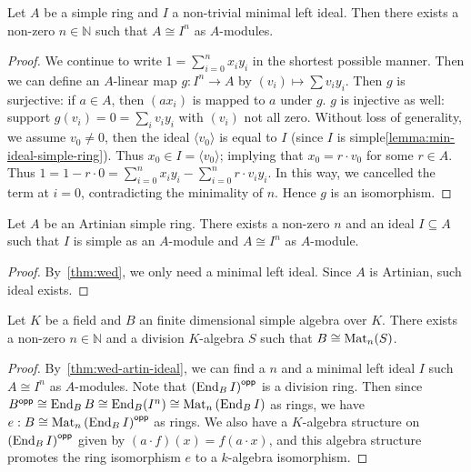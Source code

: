 \begin{theorem}[Wedderburn]\label{thm:wed}
  Let $A$ be a simple ring and $I$ a non-trivial minimal left ideal. Then there exists a non-zero $n \in \mathbb{N}$ such that $A \cong I^{n}$ as $A$-modules.
  \leanok
\end{theorem}

\begin{proof}
  We continue to write $1 = \sum_{i=0}^{n}x_{i}y_{i}$ in the shortest possible manner. Then we can define an $A$-linear map $g : I^{n}\to A$ by $(v_{i})\mapsto \sum v_{i}y_{i}$. Then $g$ is surjective: if $a \in A$, then $(ax_{i})$ is mapped to $a$ under $g$. $g$ is injective as well: support $g(v_{i})=0=\sum_{i}v_{i}y_{i}$ with $(v_{i})$ not all zero. Without loss of generality, we assume $v_{0} \ne 0$, then the ideal $\langle v_{0}\rangle$ is equal to $I$ (since $I$ is simple\cref{lemma:min-ideal-simple-ring}). Thus $x_{0}\in I = \langle v_{0}\rangle$; implying that $x_{0}=r\cdot v_{0}$ for some $r\in A$. Thus $1=1 - r\cdot 0 = \sum_{i=0}^{n}x_{i}y_{i}-\sum_{i=0}^{n}r\cdot v_{i}y_{i}$. In this way, we cancelled the term at $i=0$, contradicting the minimality of $n$. Hence $g$ is an isomorphism.
\end{proof}

\begin{theorem}
  Let $A$ be an Artinian simple ring. There exists a non-zero $n$ and an ideal $I \subseteq A$ such that $I$ is simple as an $A$-module and $A \cong I^{n}$ as $A$-module.
  \label{thm:wed-artin-ideal}
  \leanok
\end{theorem}

\begin{proof}
  By~\cref{thm:wed}, we only need a minimal left ideal. Since $A$ is Artinian, such ideal exists.
\end{proof}

\begin{theorem}
  \label{thm:wed-artin-algebra}
  Let $K$ be a field and $B$ an finite dimensional simple algebra over $K$. There exists a non-zero $n\in\mathbb{N}$ and a division $K$-algebra $S$ such that $B \cong \operatorname{Mat}_{n}(S)$.
  \leanok
\end{theorem}

\begin{proof}
  By~\cref{thm:wed-artin-ideal}, we can find a $n$ and a minimal left ideal $I$ such $A \cong I^{n}$ as $A$-modules. Note that ${\left(\operatorname{End}_{B}I\right)}^{\mathsf{opp}}$ is a division ring. Then since $B^{\mathsf{opp}}\cong\operatorname{End}_{B}B\cong{\operatorname{End}_{B}(I^{n})}\cong\operatorname{Mat}_{n}\left(\operatorname{End}_{B}I\right)$ as rings, we have $e : B\cong \operatorname{Mat}_{n}\left(\operatorname{End}_{B}I\right)^{\mathsf{opp}}$ as rings. We also have a $K$-algebra structure on ${\left(\operatorname{End}_{B} I\right)}^{\mathsf{opp}}$ given by $(a \cdot f)(x)=f(a\cdot x)$, and this algebra structure promotes the ring isomorphism $e$ to a $k$-algebra isomorphism.
\end{proof}

